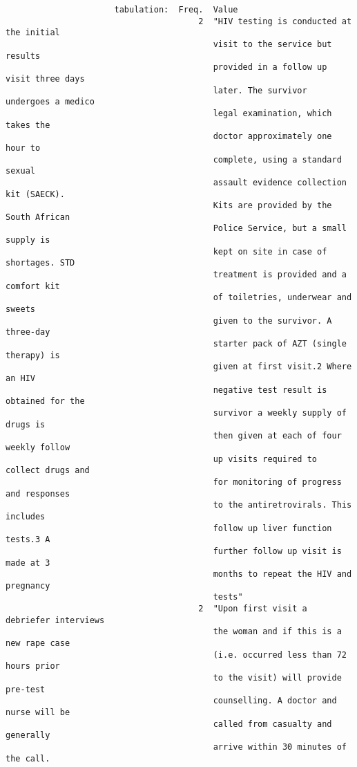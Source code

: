 \documentclass{article}
\begin{document}
\begin{verbatim}
                      tabulation:  Freq.  Value
                                       2  "HIV testing is conducted at the initial
                                          visit to the service but results
                                          provided in a follow up visit three days
                                          later. The survivor undergoes a medico
                                          legal examination, which takes the
                                          doctor approximately one hour to
                                          complete, using a standard sexual
                                          assault evidence collection kit (SAECK).
                                          Kits are provided by the South African
                                          Police Service, but a small supply is
                                          kept on site in case of shortages. STD
                                          treatment is provided and a comfort kit
                                          of toiletries, underwear and sweets
                                          given to the survivor. A three-day
                                          starter pack of AZT (single therapy) is
                                          given at first visit.2 Where an HIV
                                          negative test result is obtained for the
                                          survivor a weekly supply of drugs is
                                          then given at each of four weekly follow
                                          up visits required to collect drugs and
                                          for monitoring of progress and responses
                                          to the antiretrovirals. This includes
                                          follow up liver function tests.3 A
                                          further follow up visit is made at 3
                                          months to repeat the HIV and pregnancy
                                          tests"
                                       2  "Upon first visit a debriefer interviews
                                          the woman and if this is a new rape case
                                          (i.e. occurred less than 72 hours prior
                                          to the visit) will provide pre-test
                                          counselling. A doctor and nurse will be
                                          called from casualty and generally
                                          arrive within 30 minutes of the call.

\end{verbatim}
\end{document}
